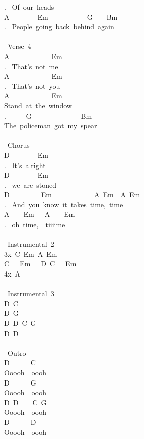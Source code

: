 {. \ Of\ our\ heads\\
A\ \ \ \ \ \ \ \ Em\ \ \ \ \ \ \ \ \ \ \ G\ \ \ \ Bm\\
. \ People\ going\ back\ behind\ again\\
\\
\lbrack\ Verse\ 4\rbrack\\
A\ \ \ \ \ \ \ \ \ \ \ \ Em\\
. \ That's\ not\ me\\
A\ \ \ \ \ \ \ \ \ \ \ \ Em\\
. \ That's\ not\ you\\
A\ \ \ \ \ \ \ \ \ \ \ \ Em\\
Stand\ at\ the\ window\\
. \ \ \ \ \ G\ \ \ \ \ \ \ \ \ \ \ \ \ \ Bm\\
The\ policeman\ got\ my\ spear\\
\\
\lbrack\ Chorus\rbrack\\
D\ \ \ \ \ \ \ \ Em\\
. \ It's\ alright\\
D\ \ \ \ \ \ \ \ Em\\
. \ we\ are\ stoned\\
D\ \ \ \ \ \ \ \ \ Em\ \ \ \ \ \ \ \ \ \ \ \ A\ Em\ \ A\ Em\\
. \ And\ you\ know\ it\ takes\ time,\ time\\
A\ \ \ \ Em\ \ \ A\ \ \ \ Em\\
. \ oh\ time,\ \ tiiiime\\
\\
\lbrack\ Instrumental\ 2\rbrack\\
3x\ C\ Em\ A\ Em\\
C\ \ \ Em\ \ \ D\ C\ \ \ Em\\
4x\ A\\
\\
\lbrack\ Instrumental\ 3\rbrack\\
D\ C\\
D\ G\\
D\ D\ C\ G\\
D\ D\\
\\
\lbrack\ Outro\rbrack\\
D\ \ \ \ \ \ C\\
Ooooh\ \ oooh\\
D\ \ \ \ \ \ G\\
Ooooh\ \ oooh\\
D\ D\ \ \ \ C\ G\\
Ooooh\ \ oooh\\
D\ \ \ \ \ \ D\\
Ooooh\ \ oooh\ }
